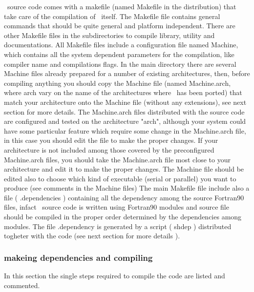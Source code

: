 \PDAC\ source code comes with a makefile (named Makefile in the distribution)
that take care of the compilation of \PDAC\ itself.
The Makefile file contains general commands that should be quite general
and platform independent. There are other Makefile files in the 
subdirectories to compile library, utility and documentations.
All Makefile files include a configuration file named Machine,
which contains all the system dependent parameters for the compilation,
like compiler name and compilations flags.
In the main directory there are several Machine files already prepared
for a number of existing architectures, then, before compiling anything
you should copy the Machine file (named Machine.arch, where arch vary 
on the name of the architectures where \PDAC\ has been ported) that match your 
architecture onto the Machine file (without any extensions), see next section
for more details. The Machine.arch files distributed with the source code
are configured and tested on the architecture "arch", although your system
could have some particular feature which require some change in the 
Machine.arch file, in this case you should edit the file to make the
proper changes. If your architecture is not included among those covered
by the preconfigured Machine.arch files, you should take the Machine.arch
file most close to your architecture and edit it to make the proper changes.
The Machine file should be edited also to choose which kind of executable
(serial or parallel) you want to produce (see comments in the Machine files)
The main Makefile file include also a file ( .dependencies ) containing
all the dependency among the source Fortran90 files, infact \PDAC\
source code is written using Fortran90 modules and source file
should be compiled in the proper order determined by the dependencies
among modules. The file .dependency is generated by a script ( shdep )
distributed togheter with the code (see next section for more details ).

\subsubsection{ makeing dependencies and compiling }

In this section the single steps required to compile the code
are listed and commented.

